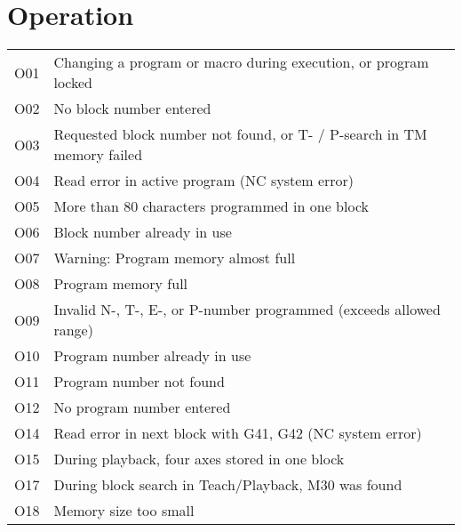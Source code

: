 \documentclass[openany,11pt]{book}
\begin{document}
\section*{Operation}

\begin{table}[!h]
    \begin{tabular}{ll}
    O01 & Changing a program or macro during execution, or program locked \\
    O02 & No block number entered \\
    O03 & Requested block number not found, or T- / P-search in TM memory failed \\
    O04 & Read error in active program (NC system error) \\
    O05 & More than 80 characters programmed in one block \\
    O06 & Block number already in use \\
    O07 & Warning: Program memory almost full \\
    O08 & Program memory full \\
    O09 & Invalid N-, T-, E-, or P-number programmed (exceeds allowed range) \\
    O10 & Program number already in use \\
    O11 & Program number not found \\
    O12 & No program number entered \\
    O14 & Read error in next block with G41, G42 (NC system error) \\
    O15 & During playback, four axes stored in one block \\
    O17 & During block search in Teach/Playback, M30 was found \\
    O18 & Memory size too small \\
    \end{tabular}
\end{table}

\clearpage
\end{document}
